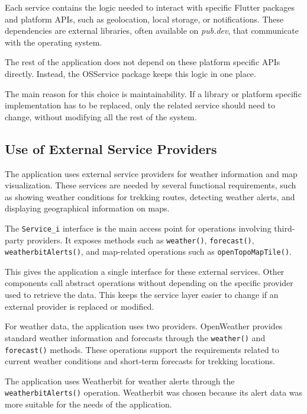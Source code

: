 Each service contains the logic needed to interact with specific Flutter packages and platform APIs, such as geolocation, local storage, or notifications. These dependencies are external libraries, often available on \textit{pub.dev}, that communicate with the operating system.

The rest of the application does not depend on these platform specific APIs directly. Instead, the OSService package keeps this logic in one place.

The main reason for this choice is maintainability. If a library or platform specific implementation has to be replaced, only the related service should need to change, without modifying all the rest of the system.


\newpage
\subsection{Use of External Service Providers}
\label{Use od External Service Providers}

The application uses external service providers for weather information and map visualization. These services are needed by several functional requirements, such as showing weather conditions for trekking routes, detecting weather alerts, and displaying geographical information on maps.

The \texttt{Service\_i} interface is the main access point for operations involving third-party providers. It exposes methods such as \texttt{weather()}, \texttt{forecast()}, \texttt{weatherbitAlerts()}, and map-related operations such as \texttt{openTopoMapTile()}.

This gives the application a single interface for these external services. Other components call abstract operations without depending on the specific provider used to retrieve the data. This keeps the service layer easier to change if an external provider is replaced or modified.

For weather data, the application uses two providers. OpenWeather provides standard weather information and forecasts through the \texttt{weather()} and \texttt{forecast()} methods. These operations support the requirements related to current weather conditions and short-term forecasts for trekking locations.

The application uses Weatherbit for weather alerts through the \texttt{weatherbitAlerts()} operation. Weatherbit was chosen because its alert data was more suitable for the needs of the application.

